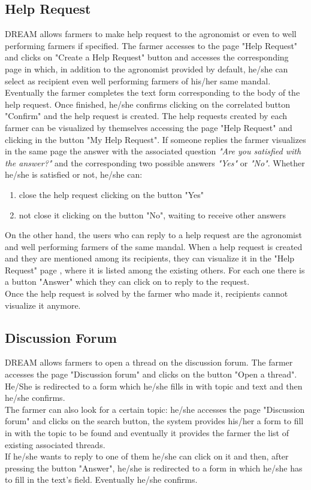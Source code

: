 \subsection{Help Request}
DREAM allows farmers to make help request to the agronomist or even to well performing farmers if specified. The farmer accesses to the page "Help Request" and clicks on "Create a Help Request" button and accesses the corresponding page in which, in addition to the agronomist provided by default, he/she can select as recipient even well performing farmers of his/her same mandal. Eventually the farmer completes the text form corresponding to the body of the help request. Once finished, he/she confirms clicking on the correlated button "Confirm" and the help request is created. The help requests created by each farmer can be visualized by themselves accessing the page "Help Request" and clicking in the button "My Help Request". If someone replies the farmer visualizes in the same page the answer with the associated question \textit{"Are you satisfied with the answer?"} and the corresponding two possible answers \textit{"Yes"} or \textit{"No"}. Whether he/she is satisfied or not, he/she can:
\begin{enumerate}
    \item close the help request clicking on the button "Yes"
    \item not close it clicking on the button "No", waiting to receive other answers
\end{enumerate}
On the other hand, the users who can reply to a help request are the agronomist and well performing farmers of the same mandal. When a help request is created and they are mentioned among its recipients, they can visualize it in the "Help Request" page , where it is listed among the existing others. For each one there is a button "Answer" which they can click on to reply to the request.\\
Once the help request is solved by the farmer who made it, recipients cannot visualize it anymore. 

\subsection{Discussion Forum}
DREAM allows farmers to open a thread on the discussion forum. The farmer accesses the page "Discussion forum" and clicks on the button "Open a thread". He/She is redirected to a form which he/she fills in with topic and text and then he/she confirms. \\
The farmer can also look for a certain topic: he/she accesses the page "Discussion forum" and clicks on the search button, the system provides his/her a form to fill in with the topic to be found and eventually it provides the farmer the list of existing associated threads.\\
If he/she wants to reply to one of them he/she can click on it and then, after pressing the button "Answer", he/she is redirected to a form in which he/she has to fill in the text's field. Eventually he/she confirms.

